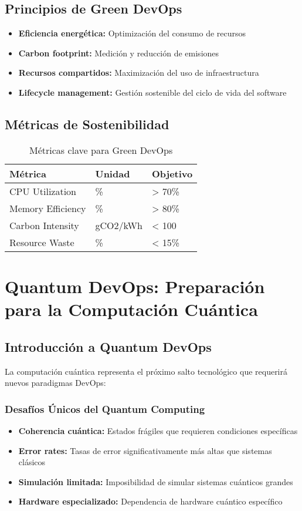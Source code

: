 \documentclass[12pt,a4paper]{article}
\begin{document}
\subsection{Principios de Green DevOps}
\begin{itemize}
    \item \textbf{Eficiencia energética:} Optimización del consumo de recursos
    \item \textbf{Carbon footprint:} Medición y reducción de emisiones
    \item \textbf{Recursos compartidos:} Maximización del uso de infraestructura
    \item \textbf{Lifecycle management:} Gestión sostenible del ciclo de vida del software
\end{itemize}

\subsection{Métricas de Sostenibilidad}
\begin{table}[h!]
\centering
\begin{tabular}{|l|l|l|}
\hline
\textbf{Métrica} & \textbf{Unidad} & \textbf{Objetivo} \\
\hline
CPU Utilization & \% & > 70\% \\
\hline
Memory Efficiency & \% & > 80\% \\
\hline
Carbon Intensity & gCO2/kWh & < 100 \\
\hline
Resource Waste & \% & < 15\% \\
\hline
\end{tabular}
\caption{Métricas clave para Green DevOps}
\end{table}

\section{Quantum DevOps: Preparación para la Computación Cuántica}

\subsection{Introducción a Quantum DevOps}
La computación cuántica representa el próximo salto tecnológico que requerirá nuevos paradigmas DevOps:

\subsubsection{Desafíos Únicos del Quantum Computing}
\begin{itemize}
    \item \textbf{Coherencia cuántica:} Estados frágiles que requieren condiciones específicas
    \item \textbf{Error rates:} Tasas de error significativamente más altas que sistemas clásicos
    \item \textbf{Simulación limitada:} Imposibilidad de simular sistemas cuánticos grandes
    \item \textbf{Hardware especializado:} Dependencia de hardware cuántico específico
\end{itemize}
\end{document}
